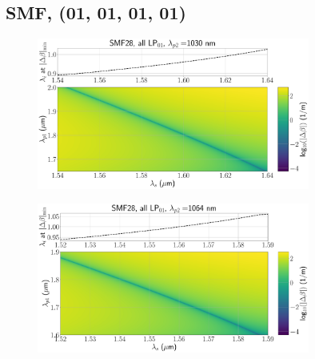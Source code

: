 \documentclass[11pt, headings=optiontoheadandtoc]{article}
\begin{document}
\subsection{SMF, (01, 01, 01, 01)}
\begin{figure}[h]
    \centering
    \includegraphics[width=0.8\textwidth]{./figs/SMF28_all_LP01_1030_2d_dbeta.pdf}
    \caption{}
    \label{fig:smf_1030}
\end{figure}
\begin{figure}[h]
    \centering
    \includegraphics[width=0.8\textwidth]{./figs/SMF28_all_LP01_1064_2d_dbeta.pdf}
    \caption{}
    \label{fig:smf_1064}
\end{figure}
\newpage
\end{document}
